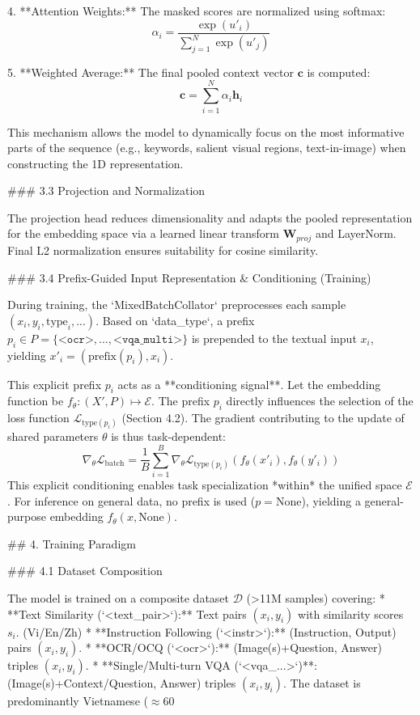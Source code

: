 4.  **Attention Weights:** The masked scores are normalized using softmax:
    $$ \alpha_i = \frac{\exp(u'_i)}{\sum_{j=1}^{N} \exp(u'_j)} $$

5.  **Weighted Average:** The final pooled context vector $\mathbf{c}$ is computed:
    $$ \mathbf{c} = \sum_{i=1}^{N} \alpha_i \mathbf{h}_i $$

This mechanism allows the model to dynamically focus on the most informative parts of the sequence (e.g., keywords, salient visual regions, text-in-image) when constructing the 1D representation.

### 3.3 Projection and Normalization

The projection head reduces dimensionality and adapts the pooled representation for the embedding space via a learned linear transform $\mathbf{W}_{proj}$ and LayerNorm. Final L2 normalization ensures suitability for cosine similarity.

### 3.4 Prefix-Guided Input Representation & Conditioning (Training)

During training, the `MixedBatchCollator` preprocesses each sample $(x_i, y_i, \text{type}_i, ...)$. Based on `data_type`, a prefix $p_i \in P = \{ \texttt{<ocr>}, ..., \texttt{<vqa\_multi>} \}$ is prepended to the textual input $x_i$, yielding $x'_i = (\text{prefix}(p_i), x_i)$.

This explicit prefix $p_i$ acts as a **conditioning signal**. Let the embedding function be $f_\theta: (X', P) \mapsto \mathcal{E}$. The prefix $p_i$ directly influences the selection of the loss function $\mathcal{L}_{\text{type}(p_i)}$ (Section 4.2). The gradient contributing to the update of shared parameters $\theta$ is thus task-dependent:
$$ \nabla_{\theta} \mathcal{L}_{\text{batch}} = \frac{1}{B} \sum_{i=1}^{B} \nabla_{\theta} \mathcal{L}_{\text{type}(p_i)}(f_\theta(x'_i), f_\theta(y'_i)) $$
This explicit conditioning enables task specialization *within* the unified space $\mathcal{E}$. For inference on general data, no prefix is used ($p = \text{None}$), yielding a general-purpose embedding $f_\theta(x, \text{None})$.

## 4. Training Paradigm

### 4.1 Dataset Composition

The model is trained on a composite dataset $\mathcal{D}$ (>11M samples) covering:
*   **Text Similarity (`<text_pair>`):** Text pairs $(x_i, y_i)$ with similarity scores $s_i$. (Vi/En/Zh)
*   **Instruction Following (`<instr>`):** (Instruction, Output) pairs $(x_i, y_i)$.
*   **OCR/OCQ (`<ocr>`):** (Image(s)+Question, Answer) triples $(x_i, y_i)$.
*   **Single/Multi-turn VQA (`<vqa_...>`)**: (Image(s)+Context/Question, Answer) triples $(x_i, y_i)$.
The dataset is predominantly Vietnamese ($\approx$60%

